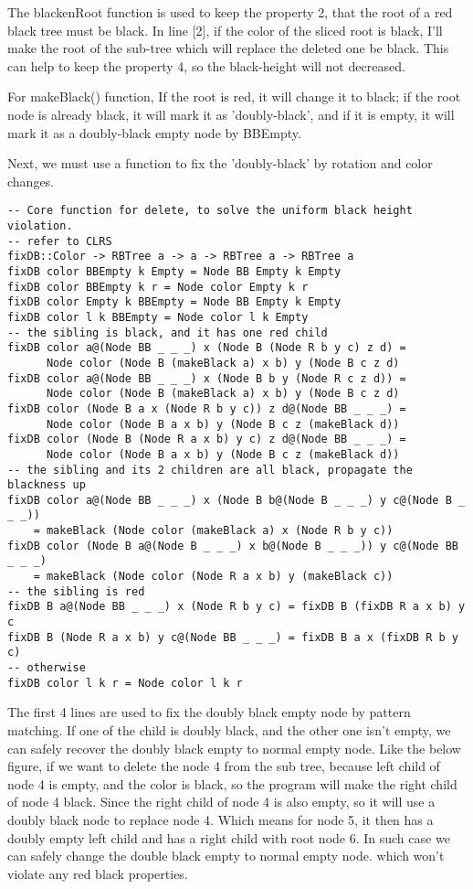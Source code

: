 \documentclass{article}
\begin{document}
The blackenRoot function is used to keep the property 2, that the root of a red black tree
must be black. In line [2], if the color of the sliced root is black, I'll make the root 
of the sub-tree which will replace the deleted one be black. This can help to keep the property
4, so the black-height will not decreased.

For makeBlack() function, If the root is red, it will change it to black; if the root node is 
already black, it will mark it as 'doubly-black', and if it is empty, it will mark it as a 
doubly-black empty node by BBEmpty.

Next, we must use a function to fix the 'doubly-black' by rotation and color changes.

\begin{lstlisting}
-- Core function for delete, to solve the uniform black height violation.
-- refer to CLRS
fixDB::Color -> RBTree a -> a -> RBTree a -> RBTree a
fixDB color BBEmpty k Empty = Node BB Empty k Empty
fixDB color BBEmpty k r = Node color Empty k r
fixDB color Empty k BBEmpty = Node BB Empty k Empty
fixDB color l k BBEmpty = Node color l k Empty
-- the sibling is black, and it has one red child
fixDB color a@(Node BB _ _ _) x (Node B (Node R b y c) z d) = 
      Node color (Node B (makeBlack a) x b) y (Node B c z d)
fixDB color a@(Node BB _ _ _) x (Node B b y (Node R c z d)) = 
      Node color (Node B (makeBlack a) x b) y (Node B c z d)
fixDB color (Node B a x (Node R b y c)) z d@(Node BB _ _ _) = 
      Node color (Node B a x b) y (Node B c z (makeBlack d))
fixDB color (Node B (Node R a x b) y c) z d@(Node BB _ _ _) = 
      Node color (Node B a x b) y (Node B c z (makeBlack d))
-- the sibling and its 2 children are all black, propagate the blackness up
fixDB color a@(Node BB _ _ _) x (Node B b@(Node B _ _ _) y c@(Node B _ _ _))
    = makeBlack (Node color (makeBlack a) x (Node R b y c))
fixDB color (Node B a@(Node B _ _ _) x b@(Node B _ _ _)) y c@(Node BB _ _ _)
    = makeBlack (Node color (Node R a x b) y (makeBlack c))
-- the sibling is red
fixDB B a@(Node BB _ _ _) x (Node R b y c) = fixDB B (fixDB R a x b) y c
fixDB B (Node R a x b) y c@(Node BB _ _ _) = fixDB B a x (fixDB R b y c)
-- otherwise
fixDB color l k r = Node color l k r
\end{lstlisting}

The first 4 lines are used to fix the doubly black empty node by pattern matching.
If one of the child is doubly black, and the other one isn't empty, we can safely
recover the doubly black empty to normal empty node. Like the below figure, if we
want to delete the node 4 from the sub tree, because left child of node 4 is empty, 
and the color is black, so the program will make the right child of node 4 black.
Since the right child of node 4 is also empty, so it will use a doubly black node
to replace node 4. Which means for node 5, it then has a doubly empty left child
and has a right child with root node 6. In such case we can safely change the
double black empty to normal empty node. which won't violate any red black properties.
\end{document}
